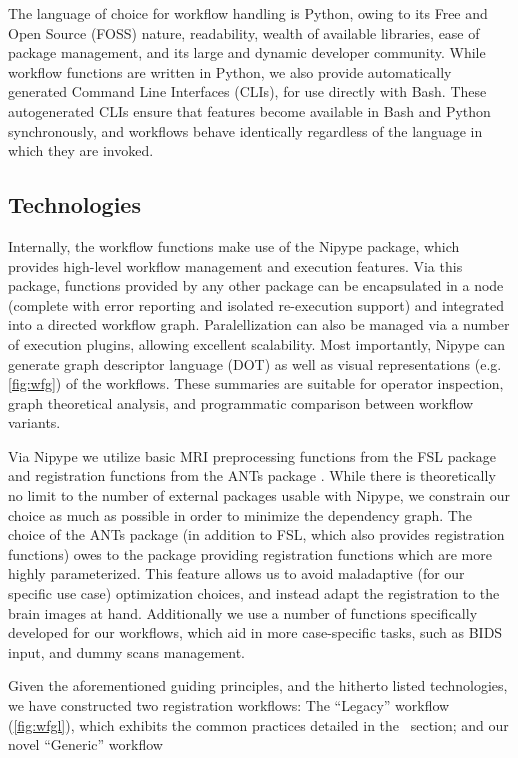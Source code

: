 The language of choice for workflow handling is Python, owing to its Free and Open Source (FOSS) nature, readability, wealth of available libraries, ease of package management, and its large and dynamic developer community.
While workflow functions are written in Python, we also provide automatically generated Command Line Interfaces (CLIs), for use directly with Bash.
These autogenerated CLIs ensure that features become available in Bash and Python synchronously, and workflows behave identically regardless of the language in which they are invoked.

\subsection{Technologies}

Internally, the workflow functions make use of the Nipype \cite{nipype} package, which provides high-level workflow management and execution features.
Via this package, functions provided by any other package can be encapsulated in a node (complete with error reporting and isolated re-execution support) and integrated into a directed workflow graph.
Paralellization can also be managed via a number of execution plugins, allowing excellent scalability.
Most importantly, Nipype can generate graph descriptor language (DOT) as well as visual representations (e.g. \cref{fig:wfg}) of the workflows.
These summaries are suitable for operator inspection, graph theoretical analysis, and programmatic comparison between workflow variants.

Via Nipype we utilize basic MRI preprocessing functions from the FSL package \cite{fsl} and registration functions from the ANTs package \cite{ants}.
While there is theoretically no limit to the number of external packages usable with Nipype, we constrain our choice as much as possible in order to minimize the dependency graph.
The choice of the ANTs package (in addition to FSL, which also provides registration functions) owes to the package providing registration functions which are more highly parameterized.
This feature allows us to avoid maladaptive (for our specific use case) optimization choices, and instead adapt the registration to the brain images at hand.
Additionally we use a number of functions specifically developed for our workflows, which aid in more case-specific tasks, such as BIDS \cite{bids} input, and dummy scans management.

Given the aforementioned guiding principles, and the hitherto listed technologies, we have constructed two registration workflows: The “Legacy” workflow (\cref{fig:wfgl}), which exhibits the common practices detailed in the ~section; and our novel “Generic” workflow 

